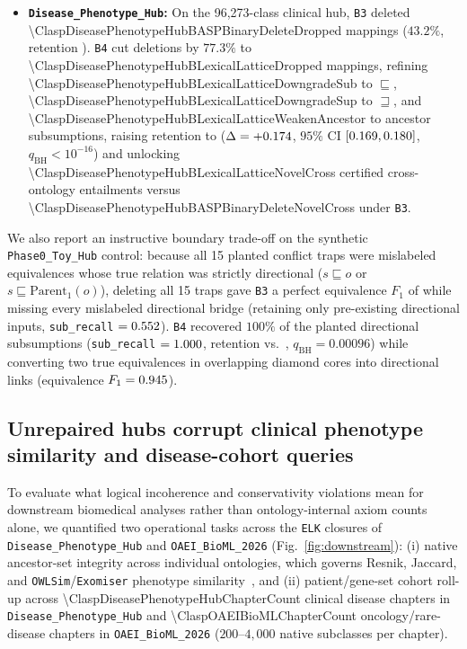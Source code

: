 \documentclass[10pt]{article}
\theoremstyle{accentdef}
\begin{document}
\begin{itemize}
  \item \textbf{\texttt{Disease\_Phenotype\_Hub}:} On the 96,273-class clinical hub, \texttt{B3} deleted \num{\ClaspDiseasePhenotypeHubBASPBinaryDeleteDropped} mappings ($43.2\%$, retention \ClaspDiseasePhenotypeHubBASPBinaryDeleteRetention{}). \texttt{B4} cut deletions by $77.3\%$ to \num{\ClaspDiseasePhenotypeHubBLexicalLatticeDropped} mappings, refining \num{\ClaspDiseasePhenotypeHubBLexicalLatticeDowngradeSub} to $\sqsubseteq$, \num{\ClaspDiseasePhenotypeHubBLexicalLatticeDowngradeSup} to $\sqsupseteq$, and \num{\ClaspDiseasePhenotypeHubBLexicalLatticeWeakenAncestor} to ancestor subsumptions, raising retention to \ClaspDiseasePhenotypeHubBLexicalLatticeRetention{} ($\Delta = +0.174{}$, $95\%$ CI $[0.169{}, 0.180{}]$, $q_{\mathrm{BH}} < 10^{-16}$) and unlocking \num{\ClaspDiseasePhenotypeHubBLexicalLatticeNovelCross} certified cross-ontology entailments versus \num{\ClaspDiseasePhenotypeHubBASPBinaryDeleteNovelCross} under \texttt{B3}.
\end{itemize}

We also report an instructive boundary trade-off on the synthetic \texttt{Phase0\_Toy\_Hub} control: because all 15 planted conflict traps were mislabeled equivalences whose true relation was strictly directional ($s \sqsubseteq o$ or $s \sqsubseteq \mathrm{Parent}_1(o)$), deleting all 15 traps gave \texttt{B3} a perfect equivalence $F_1$ of \ClaspPhaseToyHubBASPBinaryDeleteEquivFone{} while missing every mislabeled directional bridge (retaining only pre-existing directional inputs, \texttt{sub\_recall} $= 0.552{}$). \texttt{B4} recovered $100\%$ of the planted directional subsumptions (\texttt{sub\_recall} $= 1.000{}$, retention \ClaspPhaseToyHubBLexicalLatticeRetention{} vs.\ \ClaspPhaseToyHubBASPBinaryDeleteRetention{}, $q_{\mathrm{BH}} = 0.00096$) while converting two true equivalences in overlapping diamond cores into directional links (equivalence $F_1 = 0.945{}$).

\subsection*{Unrepaired hubs corrupt clinical phenotype similarity and disease-cohort queries}

To evaluate what logical incoherence and conservativity violations mean for downstream biomedical analyses rather than ontology-internal axiom counts alone, we quantified two operational tasks across the \texttt{ELK} closures of \texttt{Disease\_Phenotype\_Hub} and \texttt{OAEI\_BioML\_2026} (Fig.~\ref{fig:downstream}): (i) native ancestor-set integrity across individual ontologies, which governs Resnik, Jaccard, and \texttt{OWLSim}/\texttt{Exomiser} phenotype similarity~\cite{smedley2015exomiser}, and (ii) patient/gene-set cohort roll-up across \num{\ClaspDiseasePhenotypeHubChapterCount} clinical disease chapters in \texttt{Disease\_Phenotype\_Hub} and \num{\ClaspOAEIBioMLChapterCount} oncology/rare-disease chapters in \texttt{OAEI\_BioML\_2026} ($200\text{--}4{,}000$ native subclasses per chapter).
\end{document}
